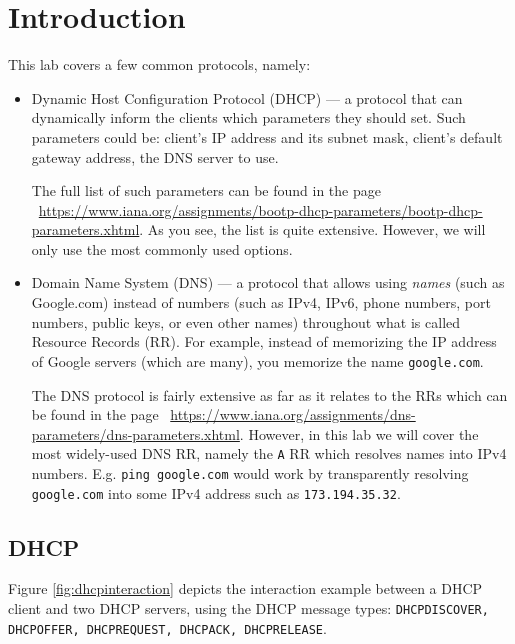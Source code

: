 \documentclass[pdftex,12pt,a4paper]{article}
\begin{document}
    \section{Introduction}
        This lab covers a few common protocols, namely:
        \begin{itemize}
            \item Dynamic Host Configuration Protocol (DHCP) --- a protocol
                that can dynamically inform the clients which parameters they
                should set. Such parameters could be: client's IP address and
                its subnet mask, client's default gateway address, the DNS
                server to use. 
                
                The full list of such parameters can be found in the page \
                \url{https://www.iana.org/assignments/bootp-dhcp-parameters/bootp-dhcp-parameters.xhtml}.
                As you see, the list is quite extensive. However, we will only
                use the most commonly used options.
            \item Domain Name System (DNS) --- a protocol that allows using
                \emph{names} (such as Google.com) instead of numbers (such as
                IPv4, IPv6, phone numbers, port numbers, public keys, or even
                other names) throughout what is called Resource Records
                (RR).  For example, instead of memorizing the IP address of
                Google servers (which are many), you memorize the name
                \texttt{google.com}. 
                
                The DNS protocol is fairly extensive as far as it relates to
                the RRs which can be found in the page \
                \url{https://www.iana.org/assignments/dns-parameters/dns-parameters.xhtml}.
                However, in this lab we will cover the most widely-used DNS RR,
                namely the \texttt{A} RR which resolves names into IPv4
                numbers. E.g. \texttt{ping google.com} would work by
                transparently resolving \texttt{google.com} into some IPv4
                address such as \texttt{173.194.35.32}.
        \end{itemize}


        \subsection{DHCP}
            Figure \ref{fig:dhcpinteraction} depicts the interaction example
            between a DHCP client and  two DHCP servers, using the DHCP message
            types: \texttt{DHCPDISCOVER, DHCPOFFER, DHCPREQUEST, DHCPACK,
            DHCPRELEASE}.  
\end{document}
